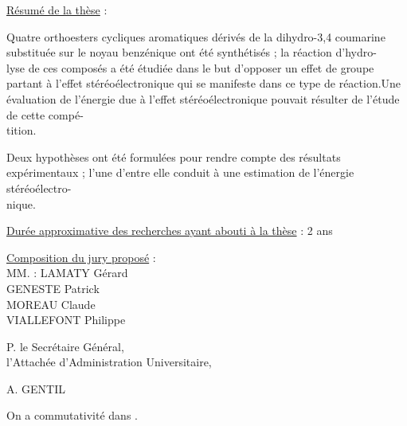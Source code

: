 \uline{Résumé de la thèse} :

Quatre orthoesters cycliques aromatiques dérivés de la dihydro-3,4 coumarine substituée sur le noyau benzénique ont été synthétisés ; la réaction d'hydro-\\
lyse de ces composés a été étudiée dans le but d'opposer un effet de groupe partant à l'effet stéréoélectronique qui se manifeste dans ce type de réaction.Une évaluation de l'énergie due à l'effet stéréoélectronique pouvait résulter de l'étude de cette compé-\\
tition.

Deux hypothèses ont été formulées pour rendre compte des résultats expérimentaux ; l'une d'entre elle conduit à une estimation de l'énergie stéréoélectro-\\
nique.

\uline{Durée approximative des recherches ayant abouti à la thèse} : 2 ans

\uline{Composition du jury proposé} :\\
MM. : LAMATY Gérard\\
GENESTE Patrick\\
MOREAU Claude\\
VIALLEFONT Philippe

P. le Secrétaire Général,\\
l'Attachée d'Administration Universitaire,

A. GENTIL

 On a commutativité dans
.

